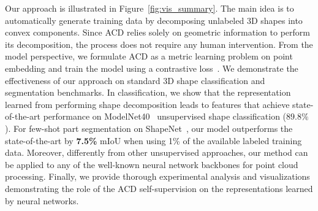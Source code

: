 Our approach is illustrated in Figure~\ref{fig:vis_summary}.  The main
idea is to automatically generate training data by decomposing
unlabeled 3D shapes into convex components.  Since ACD relies solely
on geometric information to perform its decomposition, the process
does not require any human intervention.  From the model perspective,
we formulate ACD as a metric learning problem on point embedding and
train the model using a contrastive
loss~\cite{hadsell2006dimensionality,chopra2005learning}.  
We demonstrate the
effectiveness of our approach on standard 3D shape classification and
segmentation benchmarks.  In classification, we show that the
representation learned from performing shape decomposition leads to
features that achieve state-of-the-art performance on
ModelNet40~\cite{wu20153d} unsupervised shape classification ($\mathbf{89.8\%}$).  For
few-shot part segmentation on ShapeNet~\cite{Chang2015ShapeNetAI}, our
model outperforms the state-of-the-art by \textbf{7.5\%} mIoU when
using 1\% of the available labeled training data.  Moreover, differently from
other unsupervised approaches, our method can be applied to any of the
well-known neural network backbones for point cloud processing.
Finally, we provide thorough experimental analysis and visualizations
demonstrating the role of the ACD self-supervision on the
representations learned by neural networks.
